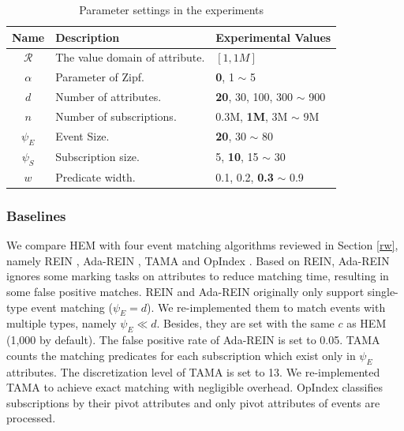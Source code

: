 \documentclass[runningheads]{llncs}
\begin{document}
\begin{table}[tbp]
\caption{Parameter settings in the experiments}
\centering
\label{psd}
\begin{tabular}{|c|l|l|}
\hline
Name & Description & Experimental Values  \\ \hline
 $\mathcal{R}$ & The value domain of attribute. & $[1,1M]$ \\ \hline
 $\alpha$ & Parameter of Zipf. &  \textbf{0}, 1 $\sim$ 5 \\ \hline %
$d$      & Number of attributes. &  \textbf{20}, 30, 100, 300 $\sim$ 900   \\ \hline
$n$      & Number of subscriptions. & 0.3M, \textbf{1M}, 3M $\sim$ 9M \\ \hline
$\psi_E$      & Event Size.  & \textbf{20}, 30 $\sim$ 80 \\ \hline
$\psi_S$      & Subscription size. & 5, \textbf{10}, 15 $\sim$ 30      \\ \hline
$w$ & Predicate width. & 0.1, 0.2, \textbf{0.3} $\sim$ 0.9 \\ \hline
\end{tabular}
\end{table}



\subsubsection{Baselines}
We compare HEM with four event matching algorithms reviewed in Section \ref{rw}, namely REIN \cite{REIN}, Ada-REIN \cite{Ada-REIN}, TAMA \cite{TAMA} and OpIndex \cite{OpIndex}. Based on REIN, Ada-REIN ignores some marking tasks on attributes to reduce matching time, resulting in some false positive matches. REIN and Ada-REIN originally only support single-type event matching ($\psi_E=d$). We re-implemented them to match events with multiple types, namely $\psi_E \ll d$. Besides, they are set with the same $c$ as HEM (1,000 by default). The false positive rate of Ada-REIN is set to 0.05. TAMA counts the matching predicates for each subscription which exist only in $\psi_E$ attributes. The discretization level of TAMA is set to 13. We re-implemented TAMA to achieve exact matching with negligible overhead. OpIndex classifies subscriptions by their pivot attributes and only pivot attributes of events are processed.  
\end{document}

